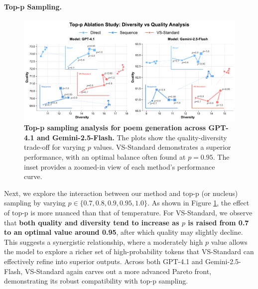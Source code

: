 \paragraph{Top-p Sampling.}
\begin{figure}[ht]
    \centering
    \includegraphics[width=1.0\linewidth]{figures/ablation/decoding_strategies/top_p_ablation_inset.pdf}
    \caption{\textbf{Top-p sampling analysis for poem generation across GPT-4.1 and Gemini-2.5-Flash.} The plots show the quality-diversity trade-off for varying $p$ values. VS-Standard demonstrates a superior performance, with an optimal balance often found at $p=0.95$. The inset provides a zoomed-in view of each method's performance curve.}
    \label{fig:top_p_ablation}
\end{figure}

Next, we explore the interaction between our method and top-p (or nucleus) sampling by varying $p \in \{0.7, 0.8, 0.9, 0.95, 1.0\}$. As shown in Figure \ref{fig:top_p_ablation}, the effect of top-p is more nuanced than that of temperature. For VS-Standard, we observe that \textbf{both quality and diversity tend to increase as $p$ is raised from 0.7 to an optimal value around 0.95}, after which quality may slightly decline. This suggests a synergistic relationship, where a moderately high $p$ value allows the model to explore a richer set of high-probability tokens that VS-Standard can effectively refine into superior outputs. Across both GPT-4.1 and Gemini-2.5-Flash, VS-Standard again carves out a more advanced Pareto front, demonstrating its robust compatibility with top-p sampling.

